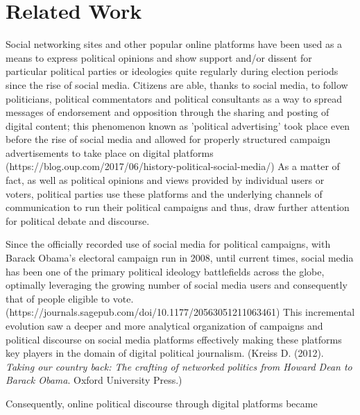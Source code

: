 \section{Related Work}

Social networking sites and other popular online platforms have been used as a means to express political opinions and show support and/or dissent for particular political parties or ideologies quite regularly during election periods since the rise of social media. Citizens are able, thanks to social media, to follow politicians, political commentators and political consultants as a way to spread messages of endorsement and opposition through the sharing and posting of digital content; this phenomenon known as 'political advertising' took place even before the rise of social media and allowed for properly structured campaign advertisements to take place on digital platforms (https://blog.oup.com/2017/06/history-political-social-media/) As a matter of fact, as well as  political opinions and views provided by individual users or voters, political parties use these platforms and the underlying channels of communication to run their political campaigns and thus, draw further attention for political debate and discourse. 

Since the officially recorded use of social media for political campaigns, with Barack Obama's electoral campaign run in 2008, until current times, social media has been one of the primary political ideology battlefields across the globe, optimally leveraging the growing number of social media users and consequently that of people eligible to vote. (https://journals.sagepub.com/doi/10.1177/20563051211063461) This incremental evolution saw a deeper and more analytical organization of campaigns and political discourse on social media platforms effectively making these platforms key players in the domain of digital political journalism. (Kreiss D. (2012). \textit{Taking our country back: The crafting of networked politics from Howard Dean to Barack Obama}. Oxford University Press.)

Consequently, online political discourse through digital platforms became 

